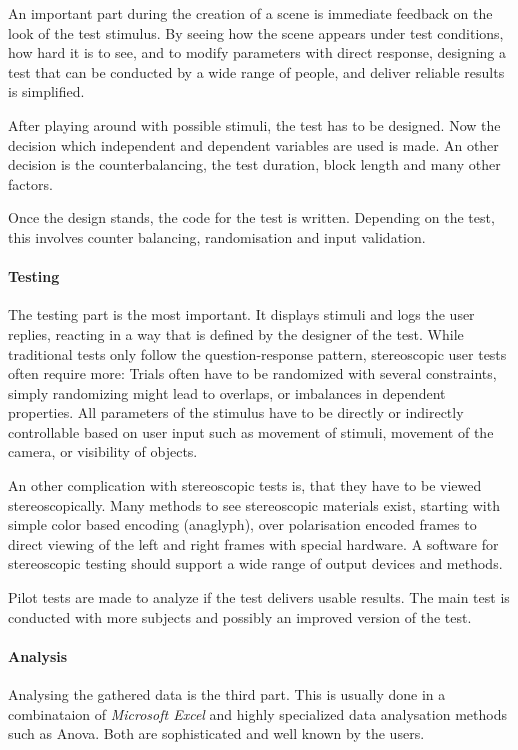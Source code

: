 An important part during the creation of a scene is immediate feedback on the look of the test stimulus.
By seeing how the scene appears under test conditions, how hard it is to see, and to modify parameters with direct response,
designing a test that can be conducted by a wide range of people, and deliver reliable results is simplified.

After playing around with possible stimuli, the test has to be designed.
Now the decision which independent and dependent variables are used is made.
An other decision is the counterbalancing, the test duration, block length and many other factors.

Once the design stands, the code for the test is written.
Depending on the test, this involves counter balancing, randomisation and input validation.


\paragraph{Testing}
The testing part is the most important. It displays stimuli and logs the user replies, reacting in a way that is defined by the designer of the test. While traditional tests only follow the question-response pattern, stereoscopic user tests often require more: Trials often have to be randomized with several constraints, simply randomizing might lead to overlaps, or imbalances in dependent properties. All parameters of the stimulus have to be directly or indirectly controllable based on user input such as movement of stimuli, movement of the camera, or visibility of objects.

An other complication with stereoscopic tests is, that they have to be viewed stereoscopically.
Many methods to see stereoscopic materials exist, starting with simple color based encoding (anaglyph), over polarisation encoded frames to direct viewing of the left and right frames with special hardware.
A software for stereoscopic testing should support a wide range of output devices and methods.

Pilot tests are made to analyze if the test delivers usable results.
The main test is conducted with more subjects and possibly an improved version of the test.

\paragraph{Analysis}
Analysing the gathered data is the third part. This is usually done in a combinataion of \textit{Microsoft Excel} and highly specialized data analysation methods such as Anova. Both are sophisticated and well known by the users.

